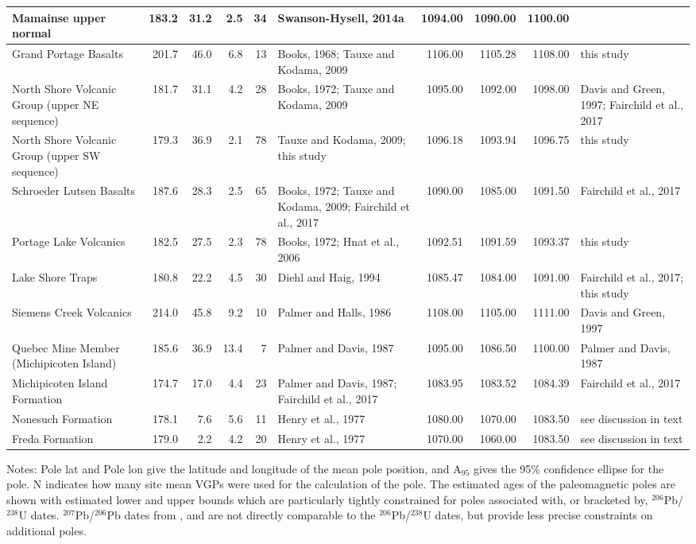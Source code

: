 \documentclass[11pt,letterpaper]{article}
\begin{document}
\begin{landscape}
\begin{table}
\begin{tabular}{p{3.5 cm}rrrrp{3.5 cm}rrrp{3.5 cm}}
 \midrule
 Mamainse upper normal &  183.2 &  31.2 &  2.5 &  34 &  Swanson-Hysell, 2014a &  1094.00 &  1090.00 &  1100.00 &   \\
 \midrule
 Grand Portage Basalts &  201.7 &  46.0 &  6.8 &  13 &  Books, 1968; Tauxe and Kodama, 2009 &  1106.00 &  1105.28 &  1108.00 &  this study \\
 \midrule
 North Shore Volcanic Group (upper NE sequence) &  181.7 &  31.1 &  4.2 &  28 &  Books, 1972; Tauxe and Kodama, 2009 &  1095.00 &  1092.00 &  1098.00 &  Davis and Green, 1997; Fairchild et al., 2017 \\
 \midrule
 North Shore Volcanic Group (upper SW sequence) &  179.3 &  36.9 &  2.1 &  78 &  Tauxe and Kodama, 2009; this study &  1096.18 &  1093.94 &  1096.75 &  this study \\
 \midrule
 Schroeder Lutsen Basalts &  187.6 &  28.3 &  2.5 &  65 &  Books, 1972; Tauxe and Kodama, 2009; Fairchild et al., 2017 &  1090.00 &  1085.00 &  1091.50 &  Fairchild et al., 2017 \\
 \midrule
 Portage Lake Volcanics &  182.5 &  27.5 &  2.3 &  78 &  Books, 1972; Hnat et al., 2006 &  1092.51 &  1091.59 &  1093.37 &  this study \\
 \midrule
 Lake Shore Traps &  180.8 &  22.2 &  4.5 &  30 &  Diehl and Haig, 1994 &  1085.47 &  1084.00 &  1091.00 &  Fairchild et al., 2017; this study \\
 \midrule
 Siemens Creek Volcanics &  214.0 &  45.8 &  9.2 &  10 &  Palmer and Halls, 1986 &  1108.00 &  1105.00 &  1111.00 &  Davis and Green, 1997 \\
 \midrule
 Quebec Mine Member (Michipicoten Island) &  185.6 &  36.9 &  13.4 &  7 &  Palmer and Davis, 1987 &  1095.00 &  1086.50 &  1100.00 &  Palmer and Davis, 1987 \\
 \midrule
 Michipicoten Island Formation &  174.7 &  17.0 &  4.4 &  23 &  Palmer and Davis, 1987; Fairchild et al., 2017 &  1083.95 &  1083.52 &  1084.39 &  Fairchild et al., 2017 \\
 \midrule
 Nonesuch Formation &  178.1 &  7.6 &  5.6 &  11 &  Henry et al., 1977 &  1080.00 &  1070.00 &  1083.50 &  see discussion in text \\
 \midrule
 Freda Formation &  179.0 &  2.2 &  4.2 &  20 &  Henry et al., 1977 &  1070.00 &  1060.00 &  1083.50 &  see discussion in text \\
\bottomrule
\end{tabular}
Notes: Pole lat and Pole lon give the latitude and longitude of the mean pole position, and A$_{95}$ gives the 95\% confidence ellipse for the pole. N indicates how many site mean VGPs were used for the calculation of the pole. The estimated ages of the paleomagnetic poles are shown with estimated lower and upper bounds which are particularly tightly constrained for poles associated with, or bracketed by, $^{206}$Pb/$^{238}$U dates. $^{207}$Pb/$^{206}$Pb dates from \cite{Davis1985a}, \cite{Palmer1987a} and \cite{Davis1997a} are not directly comparable to the $^{206}$Pb/$^{238}$U dates, but provide less precise constraints on additional poles.
\label{tab:poles}
\end{table}
\end{landscape}
\end{document}
